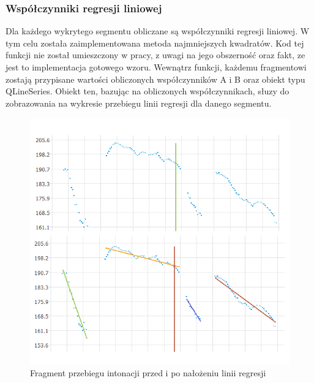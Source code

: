 \documentclass[a4paper,12 pt]{article}
\begin{document}
\subsubsection{Współczynniki regresji liniowej}
Dla każdego wykrytego segmentu obliczane są współczynniki regresji liniowej. W tym celu została zaimplementowana metoda najmniejszych kwadratów.
Kod tej funkcji nie został umieszczony w pracy, z uwagi na jego obszerność oraz fakt, ze jest to  implementacja gotowego wzoru. Wewnątrz funkcji, każdemu fragmentowi zostają przypisane wartości obliczonych współczynników A i B oraz obiekt typu QLineSeries. Obiekt ten, bazując na obliczonych współczynnikach, słuzy do zobrazowania na wykresie przebiegu linii regresji dla danego segmentu.
 \FloatBarrier
\begin{figure}[h]
\centering
\includegraphics[scale=0.7]{regresja.png}
\caption{Fragment przebiegu intonacji przed i po nałożeniu linii regresji}
\end{figure}
\FloatBarrier
\end{document}
